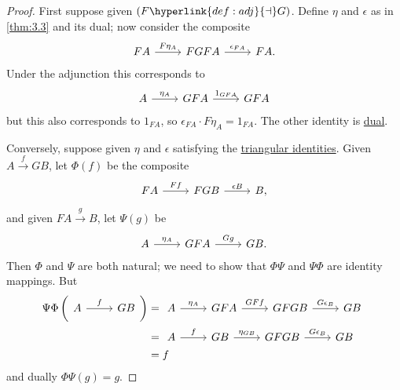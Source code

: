 \documentclass{article}
\let\to\longrightarrow
\begin{document}
\begin{proof}
  First suppose given $(F \hyperlink{def:adj}{\dashv} G)$.
  Define $\eta$ and $\epsilon$ as in \cref{thm:3.3} and its dual; now consider the composite
  \begin{equation*}
    \begin{tikzcd}
      FA \rar{F\eta_A} & FGFA \rar{\epsilon_{FA}} & FA.
    \end{tikzcd}
  \end{equation*}
  Under the adjunction this corresponds to
  \begin{equation*}
    \begin{tikzcd}
      A \rar{\eta_A} & GFA \rar{1_{GFA}} & GFA
    \end{tikzcd}
  \end{equation*}
  but this also corresponds to $1_{FA}$, so $\epsilon_{FA} \cdot F\eta_A = 1_{FA}$.
  The other identity is \hyperlink{def:duality}{dual}.

  Conversely, suppose given $\eta$ and $\epsilon$ satisfying the \hyperlink{def:triId}{triangular identities}.
  Given $A \overset{f}\to GB$, let $\Phi(f)$ be the composite
  \begin{equation*}
    \begin{tikzcd}
      FA \rar{Ff} & FGB \rar{\epsilon B} & B,
    \end{tikzcd}
  \end{equation*}
  and given $FA \overset{g}\to B$, let $\Psi(g)$ be
  \begin{equation*}
    \begin{tikzcd}
      A \rar{\eta_A} & GFA \rar{Gg} & GB.
    \end{tikzcd}
  \end{equation*}
  Then $\Phi$ and $\Psi$ are both natural; we need to show that $\Phi \Psi$ and $\Psi \Phi$ are identity mappings.
  But
  \begin{align*}
    \Psi \Phi \left(
    \begin{tikzcd}[ampersand replacement=\&]
        A \rar{f} \& GB
      \end{tikzcd}
  \right) &=
      \begin{tikzcd}[ampersand replacement=\&]
        A \rar{\eta_A} \& GFA \rar{GFf} \& GFGB \rar{G\epsilon_B} \& GB
      \end{tikzcd} \\
      &=
      \begin{tikzcd}[ampersand replacement=\&]
        A \rar{f} \& GB \rar{\eta_{GB}} \& GFGB \rar{G\epsilon_B} \& GB
      \end{tikzcd} \\
      &= f
  \end{align*}
  and dually $\Phi \Psi(g) = g$.
\end{proof}
\end{document}
